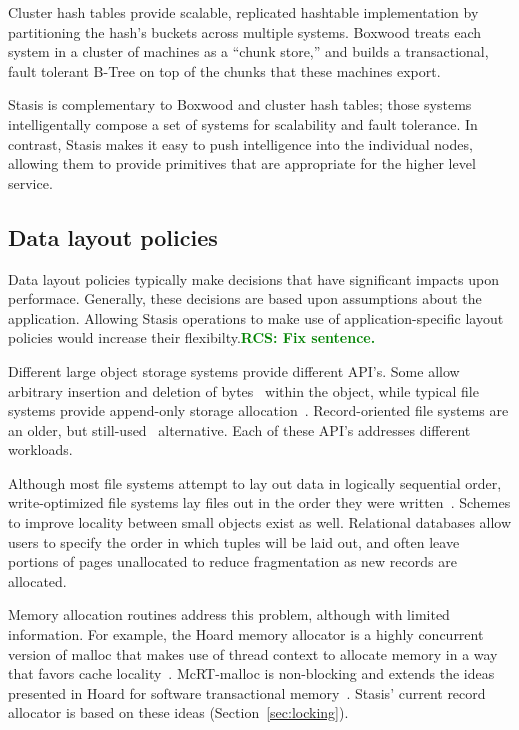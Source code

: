 \documentclass[letterpaper,twocolumn,10pt]{article}
\newcommand{\yad}{Stasis\xspace}
\newcommand{\yads}{Stasis'\xspace}
\newcommand{\rcs}[1]{\textcolor{green}{\bf RCS: #1}}
\begin{document}
Cluster hash tables provide scalable, replicated hashtable
implementation by partitioning the hash's buckets across multiple
systems.  Boxwood treats each system in a cluster of machines as a
``chunk store,'' and builds a transactional, fault tolerant B-Tree on
top of the chunks that these machines export.  

\yad is complementary to Boxwood and cluster hash tables; those
systems intelligentally compose a set of systems for scalability and
fault tolerance.  In contrast, \yad makes it easy to push intelligence
into the individual nodes, allowing them to provide primitives that
are appropriate for the higher level service.  

\subsection{Data layout policies}

Data layout policies typically make decisions that have significant
impacts upon performace.  Generally, these decisions are based upon
assumptions about the application.  Allowing \yad operations to make
use of application-specific layout policies would increase their
flexibilty.\rcs{Fix sentence.}

Different large object storage systems provide different API's.
Some allow arbitrary insertion and deletion of bytes~\cite{esm}
within the object, while typical file systems
provide append-only storage allocation~\cite{ffs}.
Record-oriented file systems are an older, but still-used~\cite{gfs}
alternative. Each of these API's addresses 
different workloads.

Although most file systems attempt to lay out data in logically sequential
order, write-optimized file systems lay files out in the order they
were written~\cite{lfs}.  Schemes to improve locality between small
objects exist as well. Relational databases allow users to specify the order
in which tuples will be laid out, and often leave portions of pages
unallocated to reduce fragmentation as new records are allocated.

Memory allocation routines address this problem, although with limited
information.  For example, the Hoard memory allocator is a highly
concurrent version of malloc that makes use of thread context to
allocate memory in a way that favors cache locality~\cite{hoard}.
McRT-malloc is non-blocking and extends the ideas
presented in Hoard for software transactional memory~\cite{mcrt}.  
\yads current record allocator is based on these ideas (Section~\ref{sec:locking}).
\end{document}
